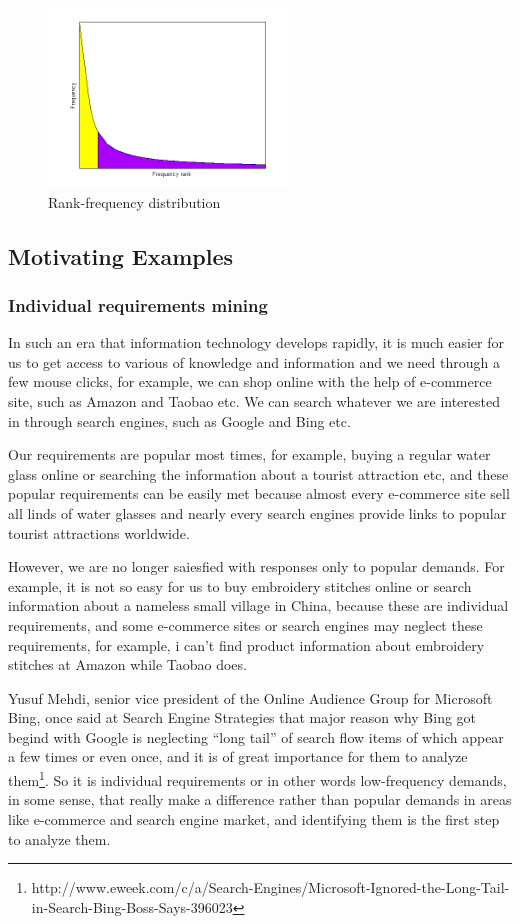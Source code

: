 \documentclass[conference]{IEEEtran}
\begin{document}
\begin{figure}
	\centering
	\includegraphics[width=2.5in]{png/zipf.png}
	\caption{Rank-frequency distribution}
	\label{fig:sim}
\end{figure}


\subsection{Motivating Examples}
\subsubsection{Individual requirements mining}
In such an era that information technology develops rapidly, it is much easier for us to get access to various of knowledge and information and we need through a few mouse clicks, for example, we can shop online with the help of e-commerce site, such as Amazon and Taobao etc. We can search whatever we are interested in through search engines, such as Google and Bing etc. \par 
Our requirements are popular most times, for example, buying a regular water glass online or searching the information about a tourist attraction etc, and these popular requirements can be easily met because almost every e-commerce site sell all linds of water glasses and nearly every search engines provide links to popular tourist attractions worldwide.  \par
However, we are no longer saiesfied with responses only to popular demands. For example, it is not so easy for us to buy embroidery stitches online or search information about a nameless small village in China, because these are individual requirements, and some e-commerce sites or search engines may neglect these requirements, for example, i can't find product information about embroidery stitches at Amazon while Taobao does. \par
Yusuf Mehdi, senior vice president of the Online Audience Group for Microsoft Bing, once said at Search Engine Strategies that major reason why Bing got begind with Google is neglecting ``long tail'' of search flow items of which appear a few times or even once, and it is of great importance for them to analyze them\footnote{http://www.eweek.com/c/a/Search-Engines/Microsoft-Ignored-the-Long-Tail-in-Search-Bing-Boss-Says-396023}. So it is individual requirements or in other words low-frequency demands, in some sense, that really make a difference rather than popular demands in areas like e-commerce and search engine market, and identifying them is the first step to analyze them.
\end{document}
